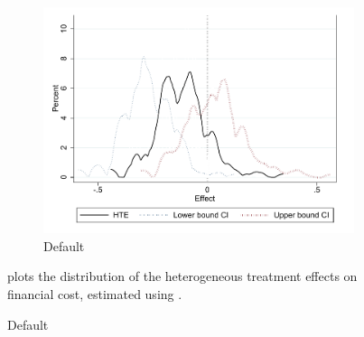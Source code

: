 \documentclass[oneside,11pt]{article}
\begin{document}
\begin{figure}[H]
\begin{center}
\begin{subfigure}{0.45\textwidth}
    \caption{Default}
       \centering
      \includegraphics[width=\textwidth]{Figuras/he_dist_def_c_pro_2.pdf}
    \end{subfigure}    
    \end{center}
         \scriptsize
     plots the distribution of the heterogeneous treatment effects on financial cost, estimated using \cite{atheygrf}.
\end{figure}
\end{document}
